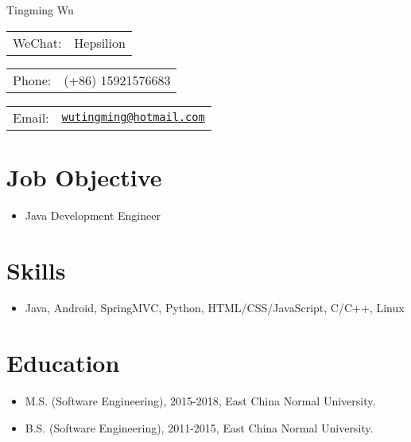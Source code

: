 \documentclass[letterpaper, UTF8]{article}
\def\name{Tingming Wu}
\begin{document}
	
	{\huge \name}
	
	
	\vspace{0.15in}  %
	
	\begin{minipage}{0.33\linewidth}
		\begin{tabular}{ll}
			WeChat: & Hepsilion \\
		\end{tabular}
	\end{minipage}
	\begin{minipage}{0.33\linewidth}
		\begin{tabular}{ll}
			Phone: & (+86) 15921576683 \\
		\end{tabular}
	\end{minipage}
	\begin{minipage}{0.33\linewidth}
		\begin{tabular}{ll}
			Email: & \href{mailto:wutingming@hotmail.com}{\tt wutingming@hotmail.com} \\
		\end{tabular}
	\end{minipage}
	\vspace{-0.1in}
	
	\section*{\textbf{Job Objective}}\vspace{-0.05in}
	\begin{itemize}
		\item Java Development Engineer
	\end{itemize}
	\vspace{-0.25in}
	
	\section*{\textbf{Skills}}\vspace{-0.05in}
	\begin{itemize}
		\item Java, Android, SpringMVC, Python, HTML/CSS/JavaScript, C/C++, Linux
	\end{itemize}
	\vspace{-0.32in}
	
	\section*{\textbf{Education}}\vspace{-0.05in}
	\begin{itemize}
		\item M.S. (Software Engineering), 2015-2018, East China Normal University.
		\item B.S. (Software Engineering), 2011-2015, East China Normal University.
	\end{itemize}	
	\vspace{-0.32in}
	
\end{document}

